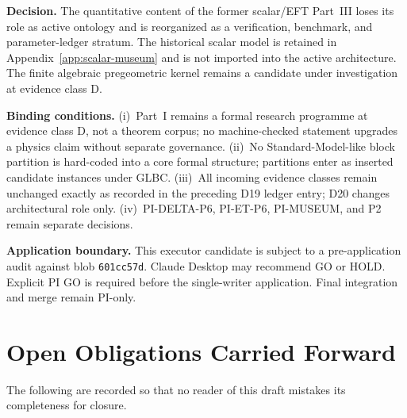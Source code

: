 \documentclass[12pt,a4paper,twoside]{article}
\theoremstyle{plain}
\theoremstyle{definition}
\theoremstyle{remark}
\begin{document}
\begin{pioverridebox}
\textbf{Decision.} The quantitative content of the former scalar/EFT Part~III
loses its role as active ontology and is reorganized as a verification,
benchmark, and parameter-ledger stratum. The historical scalar model is
retained in Appendix~\ref{app:scalar-museum} and is not imported into the
active architecture. The finite algebraic pregeometric kernel remains a
candidate under investigation at evidence class D.

\textbf{Binding conditions.}
(i)~Part~I remains a formal research programme at evidence class D, not a
theorem corpus; no machine-checked statement upgrades a physics claim without
separate governance.
(ii)~No Standard-Model-like block partition is hard-coded into a core formal
structure; partitions enter as inserted candidate instances under GLBC.
(iii)~All incoming evidence classes remain unchanged exactly as recorded in
the preceding D19 ledger entry; D20 changes architectural role only.
(iv)~PI-DELTA-P6, PI-ET-P6, PI-MUSEUM, and P2 remain separate decisions.

\textbf{Application boundary.} This executor candidate is subject to a
pre-application audit against blob \texttt{601cc57d}. Claude Desktop may
recommend GO or HOLD. Explicit PI GO is required before the single-writer
application. Final integration and merge remain PI-only.
\end{pioverridebox}

\section*{Open Obligations Carried Forward}

\noindent The following are recorded so that no reader of this draft
mistakes its completeness for closure.
\end{document}
